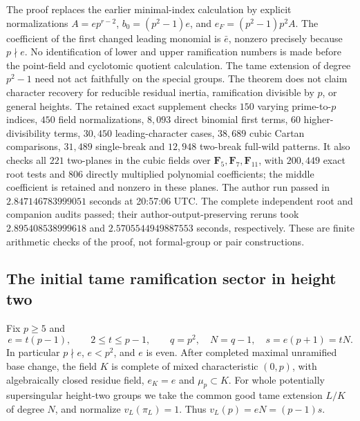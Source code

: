 \begin{remark}
\label{rem:B-RD67-scope}
The proof replaces the earlier minimal-index calculation by explicit
normalizations \(A=e p^{r-2}\), \(b_0=(p^2-1)e\), and
\(e_F=(p^2-1)p^2A\). The coefficient of the first changed leading
monomial is \(\bar e\), nonzero precisely because \(p\nmid e\).
No identification of lower and upper ramification numbers is made
before the point-field and cyclotomic quotient calculation.
The tame extension of degree \(p^2-1\) need not act faithfully on
the special groups. The theorem does not claim character recovery
for reducible residual inertia, ramification divisible by \(p\),
or general heights.
The retained exact supplement
checks \(150\) varying prime-to-\(p\) indices, \(450\) field
normalizations, \(8{,}093\) direct binomial first terms, \(60\)
higher-divisibility terms, \(30{,}450\) leading-character cases,
\(38{,}689\) cubic Cartan comparisons, \(31{,}489\) single-break
and \(12{,}948\) two-break full-wild patterns. It also checks
all \(221\) two-planes in the cubic fields over
\(\mathbf F_5,\mathbf F_7,\mathbf F_{11}\), with
\(200{,}449\) exact root tests and \(806\) directly multiplied
polynomial coefficients; the middle coefficient is retained
and nonzero in these planes. The author run passed in
\(2.847146783999051\) seconds at 20:57:06 UTC.
The complete independent root and companion audits passed; their
author-output-preserving reruns took
\(2.895408538999618\) and \(2.5705544949887553\) seconds,
respectively. These are finite arithmetic checks of the proof,
not formal-group or pair constructions.
\end{remark}


\subsection{The initial tame ramification sector in height two}

Fix \(p\ge5\) and
\[
 e=t(p-1),\qquad 2\le t\le p-1,\qquad
 q=p^2,\quad N=q-1,\quad s=e(p+1)=tN .
 \tag{B-RD68.1}
\]
In particular \(p\nmid e\), \(e<p^2\), and \(e\) is even.
After completed maximal unramified base change, the field \(K\)
is complete of mixed characteristic \((0,p)\), with algebraically
closed residue field, \(e_K=e\) and \(\mu_p\subset K\).
For whole potentially supersingular height-two groups we take
the common good tame extension \(L/K\) of degree \(N\), and normalize
\(v_L(\pi_L)=1\). Thus \(v_L(p)=eN=(p-1)s\).

